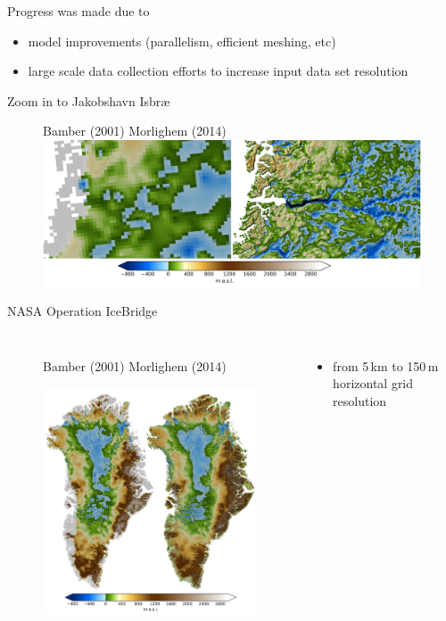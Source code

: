 \documentclass[hide notes,intlimits]{beamer}
\begin{document}
\begin{frame}
  \begin{block}{Progress was made due to}
    \begin{itemize}
    \item model improvements (parallelism, efficient meshing, etc)
    \item large scale data collection efforts to increase input data set resolution
    \end{itemize}
  \end{block}
\end{frame}



\begin{frame}{Zoom in to Jakobshavn Isbr{\ae}}
  \begin{figure}
    \small{Bamber (2001) \hspace{5em} Morlighem (2014)}
    \includegraphics[width=12cm]{jako_bed}
 \end{figure}
\end{frame}


\begin{frame}{NASA Operation IceBridge}
  \begin{columns}
    \column[c]{8cm}
    \begin{figure}
      \small{Bamber (2001) \hspace{4em} Morlighem (2014)}
      \includegraphics[height=7.5cm]{greenland_bed}
    \end{figure}
    \column[c]{4cm}
    \begin{itemize}
    \item from 5\,km to 150\,m horizontal grid resolution
    \end{itemize}
  \end{columns}
\end{frame}
\end{document}

